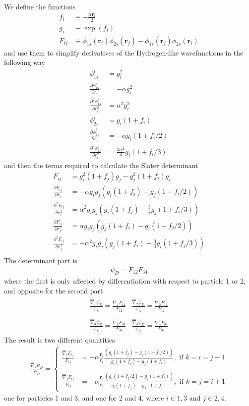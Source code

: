 \documentclass[twocolumn,12pt]{extarticle}
\newcommand{\eq}[1]{{\small\begin{align*}#1\end{align*}}}
\newcommand{\mat}[1]{\begin{matrix}#1\end{matrix}}
\renewcommand\vec[1]{\mathbf{#1}}
\newcommand{\op}[1]{\hat{#1}}
\begin{document}
We define the functions
\eq{
  f_i &\equiv -\frac{\alpha \vec r_i}{2}\\
  g_i &\equiv \exp(f_i)\\
  F_{ij} &\equiv \phi_{1s}(\vec r_i)\phi_{2s}(\vec r_j)
  -\phi_{1s}(\vec r_j)\phi_{2s}(\vec r_i)
}
and use them to simplify derivatives 
of the Hydrogen-like wavefunctions in the following way
\eq{
  \phi_{1s}^i &= g_i^2\\
  \frac{\partial \phi_{1s}^i}{\partial r_i} &= -\alpha g_i^2\\
  \frac{\partial^2 \phi_{1s}^i}{\partial r_i^2} &= \alpha^2 g_i^2\\
  \phi_{2s}^i &= g_i(1+f_i)\\
  \frac{\partial \phi_{2s}^i}{\partial r_i} &= -\alpha g_i(1+f_i/2)\\
  \frac{\partial^2 \phi_{2s}^i}{\partial r_i^2} &= \frac{3\alpha^2}{4} g_i(1+f_i/3)
}
and then the terms required to calculate the Slater determinant
\eq{
  F_{ij} &= g_i^2 (1+f_j)g_j - g_j^2 (1+f_i)g_i\\
  \frac{\partial F_{ij}}{\partial r_i} 
    &= -\alpha g_i g_j (g_i(1+f_j) - g_j (1+f_i/2))\\
  \frac{\partial^2 F_{ij}}{\partial r_i^2} 
    &= \alpha^2 g_i g_j (g_i(1+f_j) - \frac{3}{4} g_j (1+f_i/3))\\
  \frac{\partial F_{ij}}{\partial r_j} 
    &= \alpha g_i g_j (g_j(1+f_i) - g_i (1+f_j/2))\\
  \frac{\partial^2 F_{ij}}{\partial r_j^2} 
    &= -\alpha^2 g_i g_j (g_j(1+f_i) - \frac{3}{4} g_i (1+f_j/3))\\
}
The determinant part is
\eq{
  \psi_D = F_{12}F_{34}
}
where the first is only affected by differentiation with respect to particle 1 or 2,
and opposite for the second part
\eq{
  \mat{
    \frac{\op\nabla_1 \psi_D}{\psi_D} = \frac{\op\nabla_1 F_{12}}{F_{12}} &
    \frac{\op\nabla_2 \psi_D}{\psi_D} = \frac{\op\nabla_2 F_{12}}{F_{12}} \\\\
    \frac{\op\nabla_3 \psi_D}{\psi_D} = \frac{\op\nabla_3 F_{34}}{F_{34}} &
    \frac{\op\nabla_4 \psi_D}{\psi_D} = \frac{\op\nabla_4 F_{34}}{F_{34}}
  }
}
The result is two different quantities
\eq{
  \frac{\op\nabla_k \psi_D}{\psi_D} =
  \begin{cases}
    \frac{\op\nabla_i F_{ij}}{F_{ij}}
    &= -\alpha \frac{\vec r_i}{r_i} \frac{(g_i(1+f_j) 
      - g_j (1+f_i/2))}{g_i (1+f_j) - g_j (1+f_i)}
    ,\text{ if } k=i=j-1 \\\\
    \frac{\op\nabla_j F_{ij}}{F_{ij}}
    &= -\alpha \frac{\vec r_j}{r_j}\frac{(g_i (1+f_j/2) 
      - g_j(1+f_i))}{g_i (1+f_j) - g_j (1+f_i)}
    ,\text{ if } k=j=i+1
  \end{cases}
}
one for particles 1 and 3, and one for 2 and 4, where $i\in {1,3}$ and $j\in {2,4}$.
\end{document}
